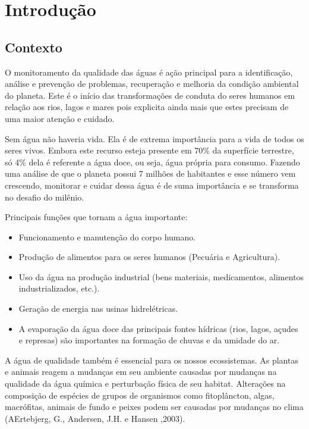 \chapter[Introdução]{Introdução}

\section{Contexto}

O monitoramento da qualidade das águas é ação principal para a identificação, análise e prevenção de problemas, recuperação e melhoria da condição ambiental do planeta. Este é o início das transformações de conduta do seres humanos em relação aos rios, lagos e mares pois explicita ainda mais que estes precisam de uma maior atenção e cuidado. 
 
Sem água não haveria vida. Ela é de extrema importância para a vida de todos os seres vivos. Embora este recurso esteja presente em 70\% da superfície terrestre, só 4\% dela é referente a água doce, ou seja, água própria para consumo. Fazendo uma análise de que o planeta possui 7 milhões de habitantes e esse número vem crescendo, monitorar e cuidar dessa água é de suma importância e se transforma no desafio do milênio. 

Principais funções que tornam a água importante:

\begin{itemize}
    \item Funcionamento e manutenção do corpo humano.
    \item Produção de alimentos para os seres humanos (Pecuária e Agricultura). 

    \item Uso da água na produção industrial (bens materiais, medicamentos, alimentos industrializados, etc.).

    \item Geração de energia nas usinas hidrelétricas.

    \item A evaporação da água doce das principais fontes hídricas (rios, lagos, açudes e represas) são importantes na formação de chuvas e da umidade do ar.


\end{itemize}


A água de qualidade também é essencial para os nossos ecossistemas. As plantas e animais reagem a mudanças em seu ambiente causadas por mudanças na qualidade da água química e perturbação física de seu habitat. Alterações na composição de espécies de grupos de organismos como fitoplâncton, algas, macrófitas, animais de fundo e peixes podem ser causadas por mudanças no clima (AErtebjerg, G., Andersen, J.H. e Hansen ,2003). 

